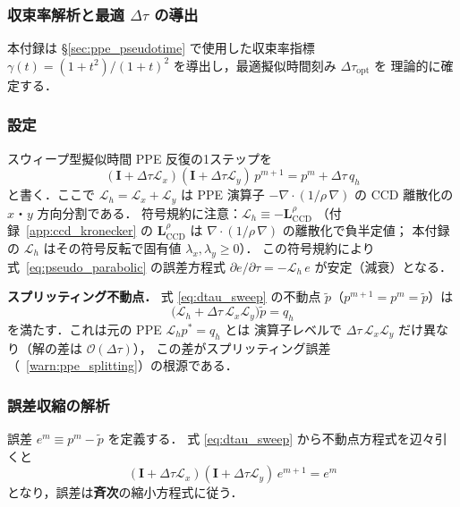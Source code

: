 \subsubsection{収束率解析と最適 \texorpdfstring{$\Delta\tau$}{Δτ} の導出}
\label{sec:dtau_derive}

本付録は §\ref{sec:ppe_pseudotime} で使用した収束率指標
$\gamma(t) = (1+t^2)/(1+t)^2$ を導出し，最適擬似時間刻み $\Delta\tau_{\mathrm{opt}}$ を
理論的に確定する．

\subsubsection*{設定}

スウィープ型擬似時間 PPE 反復の1ステップを
\begin{equation}
  (\mathbf{I} + \Delta\tau \mathcal{L}_x)(\mathbf{I} + \Delta\tau \mathcal{L}_y)\,
  p^{m+1} = p^m + \Delta\tau\,q_h
  \label{eq:dtau_sweep}
\end{equation}
と書く．ここで $\mathcal{L}_h = \mathcal{L}_x + \mathcal{L}_y$ は
PPE 演算子 $-\nabla\cdot(1/\rho\,\nabla)$ の CCD 離散化の $x$・$y$ 方向分割である．
符号規約に注意：$\mathcal{L}_h \equiv -\mathbf{L}_{\mathrm{CCD}}^{\rho}$
（付録~\ref{app:ccd_kronecker} の $\mathbf{L}_{\mathrm{CCD}}^{\rho}$ は
$\nabla\cdot(1/\rho\,\nabla)$ の離散化で負半定値；
本付録の $\mathcal{L}_h$ はその符号反転で固有値 $\lambda_x,\lambda_y \ge 0$）．
この符号規約により式~\eqref{eq:pseudo_parabolic} の誤差方程式
$\partial e/\partial\tau = -\mathcal{L}_h\,e$ が安定（減衰）となる．

\textbf{スプリッティング不動点．}
式 \eqref{eq:dtau_sweep} の不動点 $\tilde{p}$（$p^{m+1}=p^m=\tilde{p}$）は
\[
  \bigl(\mathcal{L}_h + \Delta\tau\,\mathcal{L}_x\mathcal{L}_y\bigr)\tilde{p} = q_h
\]
を満たす．これは元の PPE $\mathcal{L}_h p^* = q_h$ とは
演算子レベルで $\Delta\tau\,\mathcal{L}_x\mathcal{L}_y$ だけ異なり（解の差は $\mathcal{O}(\Delta\tau)$），
この差がスプリッティング誤差（~\ref{warn:ppe_splitting}）の根源である．

\subsubsection*{誤差収縮の解析}

誤差 $e^m \equiv p^m - \tilde{p}$ を定義する．
式 \eqref{eq:dtau_sweep} から不動点方程式を辺々引くと
\[
  (\mathbf{I}+\Delta\tau\mathcal{L}_x)(\mathbf{I}+\Delta\tau\mathcal{L}_y)\,e^{m+1} = e^m
\]
となり，誤差は\textbf{斉次}の縮小方程式に従う．

